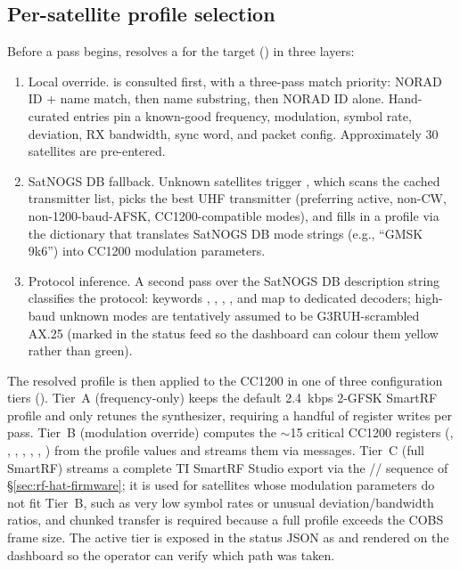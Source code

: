 \subsection*{Per-satellite profile selection}

Before a pass begins,  resolves a  for the target () in three layers:

\begin{enumerate}
    \item Local override.  is consulted first, with a three-pass match priority: NORAD ID + name match, then name substring, then NORAD ID alone. Hand-curated entries pin a known-good frequency, modulation, symbol rate, deviation, RX bandwidth, sync word, and packet config. Approximately 30 satellites are pre-entered.
    \item SatNOGS DB fallback. Unknown satellites trigger , which scans the cached transmitter list, picks the best UHF transmitter (preferring active, non-CW, non-1200-baud-AFSK, CC1200-compatible modes), and fills in a profile via the  dictionary that translates SatNOGS DB mode strings (e.g., ``GMSK 9k6'') into CC1200 modulation parameters.
    \item Protocol inference. A second pass over the SatNOGS DB description string classifies the protocol: keywords , , , , and  map to dedicated decoders; high-baud unknown modes are tentatively assumed to be G3RUH-scrambled AX.25 (marked  in the status feed so the dashboard can colour them yellow rather than green).
\end{enumerate}

The resolved profile is then applied to the CC1200 in one of three configuration tiers (). Tier~A (frequency-only) keeps the default 2.4~kbps 2-GFSK SmartRF profile and only retunes the synthesizer, requiring a handful of register writes per pass. Tier~B (modulation override) computes the $\sim$15 critical CC1200 registers (, , , , , , ) from the profile values and streams them via  messages. Tier~C (full SmartRF) streams a complete TI SmartRF Studio export via the // sequence of \S\ref{sec:rf-hat-firmware}; it is used for satellites whose modulation parameters do not fit Tier~B, such as very low symbol rates or unusual deviation/bandwidth ratios, and chunked transfer is required because a full profile exceeds the COBS frame size. The active tier is exposed in the status JSON as  and rendered on the dashboard so the operator can verify which path was taken.

